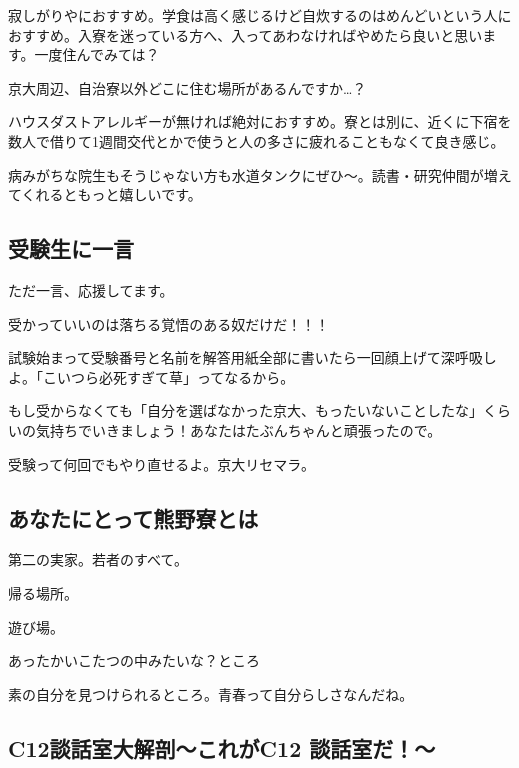 \begin{multicols}{2}
  寂しがりやにおすすめ。学食は高く感じるけど自炊するのはめんどいという人におすすめ。入寮を迷っている方へ、入ってあわなければやめたら良いと思います。一度住んでみては？

  京大周辺、自治寮以外どこに住む場所があるんですか…？

  ハウスダストアレルギーが無ければ絶対におすすめ。寮とは別に、近くに下宿を数人で借りて1週間交代とかで使うと人の多さに疲れることもなくて良き感じ。

  病みがちな院生もそうじゃない方も水道タンクにぜひ〜。読書・研究仲間が増えてくれるともっと嬉しいです。



  \subsection{受験生に一言}

  ただ一言、応援してます。

  受かっていいのは落ちる覚悟のある奴だけだ！！！

  試験始まって受験番号と名前を解答用紙全部に書いたら一回顔上げて深呼吸しよ。「こいつら必死すぎて草」ってなるから。

  もし受からなくても「自分を選ばなかった京大、もったいないことしたな」くらいの気持ちでいきましょう！あなたはたぶんちゃんと頑張ったので。

  受験って何回でもやり直せるよ。京大リセマラ。



  \subsection{あなたにとって熊野寮とは}

  第二の実家。若者のすべて。

  帰る場所。

  遊び場。

  あったかいこたつの中みたいな？ところ

  素の自分を見つけられるところ。青春って自分らしさなんだね。


\end{multicols}


\newpage
\subsection{C12談話室大解剖〜これがC12 談話室だ！～}\label{daikaibo_danwa}

